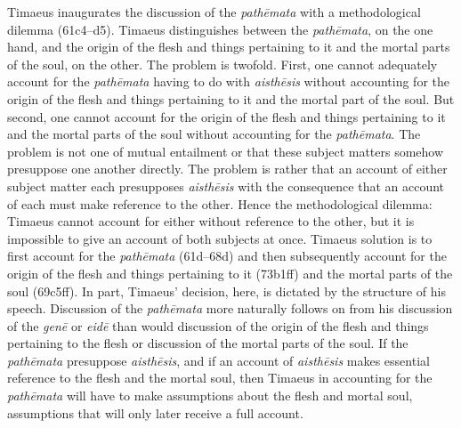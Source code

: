 Timaeus inaugurates the discussion of the \emph{pathēmata} with a methodological dilemma (61c4--d5). Timaeus distinguishes between the \emph{pathēmata}, on the one hand, and the origin of the flesh and things pertaining to it and the mortal parts of the soul, on the other. The problem is twofold. First, one cannot adequately account for the \emph{pathēmata} having to do with \emph{aisthēsis} without accounting for the origin of the flesh and things pertaining to it and the mortal part of the soul. But second, one cannot account for the origin of the flesh and things pertaining to it and the mortal parts of the soul without accounting for the \emph{pathēmata}. The problem is not one of mutual entailment or that these subject matters somehow presuppose one another directly. The problem is rather that an account of either subject matter each presupposes \emph{aisthēsis} with the consequence that an account of each must make reference to the other. Hence the methodological dilemma: Timaeus cannot account for either without reference to the other, but it is impossible to give an account of both subjects at once. Timaeus solution is to first account for the \emph{pathēmata} (61d--68d) and then subsequently account for the origin of the flesh and things pertaining to it (73b1ff) and the mortal parts of the soul (69c5ff). In part, Timaeus' decision, here, is dictated by the structure of his speech. Discussion of the \emph{pathēmata} more naturally follows on from his discussion of the \emph{genē} or \emph{eidē} than would discussion of the origin of the flesh and things pertaining to the flesh or discussion of the mortal parts of the soul. If the \emph{pathēmata} presuppose \emph{aisthēsis}, and if an account of \emph{aisthēsis} makes essential reference to the flesh and the mortal soul, then Timaeus in accounting for the \emph{pathēmata} will have to make assumptions about the flesh and mortal soul, assumptions that will only later receive a full account.

